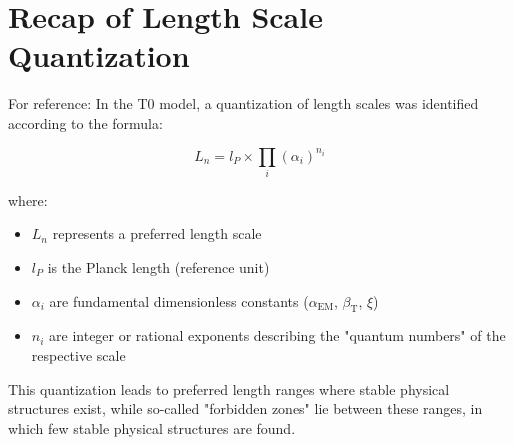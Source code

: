 \documentclass[12pt,a4paper]{article}
\newcommand{\alphaEM}{\alpha_{\text{EM}}}
\newcommand{\betaT}{\beta_{\text{T}}}
\begin{document}
	\section{Recap of Length Scale Quantization}
	\label{sec:wiederholung_quantisierung}
	
	For reference: In the T0 model, a quantization of length scales was identified according to the formula:
	
	\begin{equation}
		L_n = l_P \times \prod_{i} (\alpha_i)^{n_i}
	\end{equation}
	
	where:
	\begin{itemize}
		\item $L_n$ represents a preferred length scale
		\item $l_P$ is the Planck length (reference unit)
		\item $\alpha_i$ are fundamental dimensionless constants ($\alphaEM$, $\betaT$, $\xi$)
		\item $n_i$ are integer or rational exponents describing the "quantum numbers" of the respective scale
	\end{itemize}
	
	This quantization leads to preferred length ranges where stable physical structures exist, while so-called "forbidden zones" lie between these ranges, in which few stable physical structures are found.
	
\end{document}
